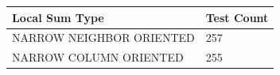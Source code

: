 \begin{table}[h!]
\centering
\begin{tabular}{ll}
\hline
\textbf{Local Sum Type} & \textbf{Test Count} \\ 
\hline
NARROW NEIGHBOR ORIENTED & 257 \\ 
NARROW COLUMN ORIENTED & 255 \\ 
\hline
\end{tabular}
\end{table}